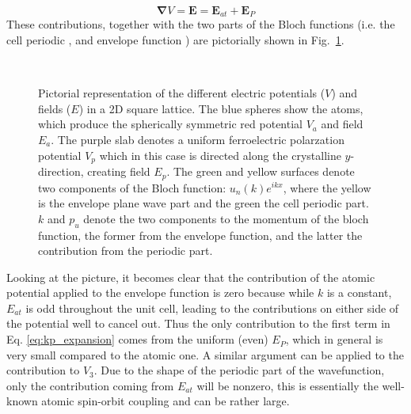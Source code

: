 \begin{equation}
	\bm{\nabla} V = \bm{E} = \bm{E}_{at} + \bm{E}_{P}
\end{equation}
These contributions, together with the two parts of the Bloch functions (i.e. the cell periodic \unkr, and envelope function \eikr) are pictorially shown in Fig.~\ref{fig:Efield_cell_drawing}. 
\begin{figure}[h]
~\centering
{}\caption{\label{fig:Efield_cell_drawing} Pictorial representation of the different electric potentials ($V$) and fields ($E$) in a 2D square lattice. The blue spheres show the atoms, which produce the spherically symmetric red potential $V_a$ and field $E_a$. The purple slab denotes a uniform ferroelectric polarzation potential $V_p$ which in this case is directed along the crystalline $y$-direction, creating field $E_p$. The green and yellow surfaces denote two components of the Bloch function: $u_n(k) e^{ikx}$, where the yellow is the envelope plane wave part and the green the cell periodic part. $k$ and $p_u$ denote the two components to the momentum of the bloch function, the former from the envelope function, and the latter the contribution from the periodic part.}
\end{figure}

Looking at the picture, it becomes clear that the contribution of the atomic potential applied to the envelope function is zero because while $k$ is a constant, $E_{at}$ is odd throughout the unit cell, leading to the contributions on either side of the potential well to cancel out. Thus the only contribution to the first term in Eq. \ref{eq:kp_expansion} comes from the uniform (even) $E_P$, which in general is very small compared to the atomic one. A similar argument can be applied to the contribution to $V_3$. Due to the shape of the periodic part of the wavefunction, only the contribution coming from $E_{at}$ will be nonzero, this is essentially the well-known atomic spin-orbit coupling and can be rather large. 


